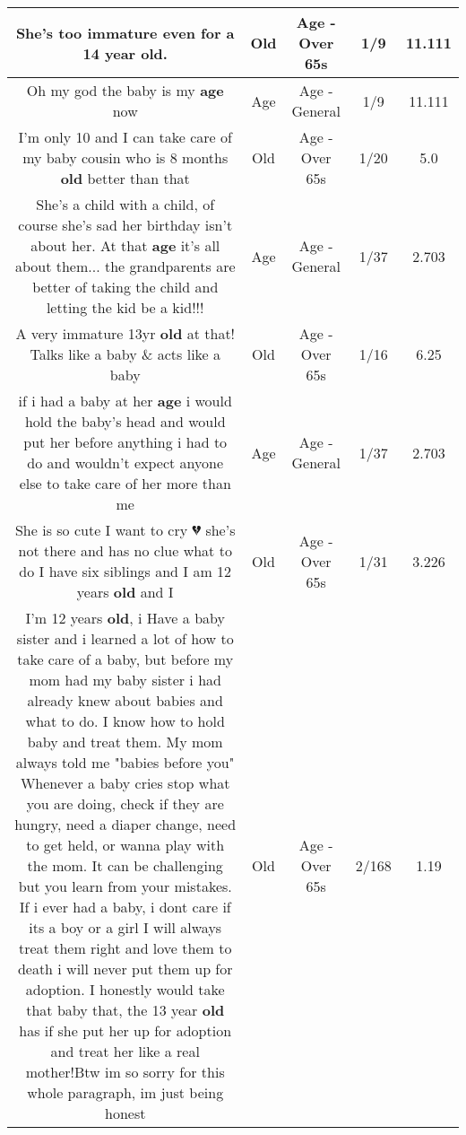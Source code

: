 \documentclass[11pt]{article}
\newlength\mylength
\begin{document}
\begin{center}
\begin{longtable}{|C{.65\mylength}|C{.30\mylength}|C{.12\mylength}|C{.12\mylength}|C{.12\mylength}|}
  \small She's too immature even for a 14 year \textbf{old}.\normalsize   & Old & Age - Over 65s & 1/9 & 11.111 \\  \hline
  \small Oh my god the baby is my \textbf{age} now\normalsize   & Age & Age - General & 1/9 & 11.111 \\  \hline
  \small I'm only 10 and I can take care of my baby cousin who is 8 months \textbf{old} better than that\normalsize   & Old & Age - Over 65s & 1/20 & 5.0 \\  \hline
  \small She's a child with a child, of course she's sad her birthday isn't about her. At that \textbf{age} it's all about them... the grandparents are better of taking the child and letting the kid be a kid!!!\normalsize   & Age & Age - General & 1/37 & 2.703 \\  \hline
  \small A very immature 13yr \textbf{old} at that! Talks like a baby \& acts like a baby\normalsize   & Old & Age - Over 65s & 1/16 & 6.25 \\  \hline
  \small if i had a baby at her \textbf{age} i would hold the baby's head and would put her before anything i had to do and wouldn't expect anyone else to take care of her more than me\normalsize   & Age & Age - General & 1/37 & 2.703 \\  \hline
  \small She is so cute I want to cry 💔 she's not there and has no clue what to do I have six siblings and I am 12 years \textbf{old} and I\normalsize   & Old & Age - Over 65s & 1/31 & 3.226 \\  \hline
  \small I'm 12 years \textbf{old}, i Have a baby sister and i learned a lot of how to take care of a baby, but before my mom had my baby sister i had already knew about babies and what to do. I know how to hold  baby and treat them. My mom always told me "babies before you" Whenever a baby cries stop what you are doing, check if they are hungry, need a diaper change, need to get held, or wanna play with the mom. It can be challenging but you learn from your mistakes. If i ever had a baby, i dont care if its a boy or a girl I will always treat them right and love them to death i will never put them up for adoption.  I honestly would take that baby that, the 13 year \textbf{old} has if she put her up for adoption and treat her like a real mother!Btw im so sorry for this whole paragraph, im just being honest\normalsize   & Old & Age - Over 65s & 2/168 & 1.19 \\  \hline

\end{longtable}
\end{center}
\end{document}
